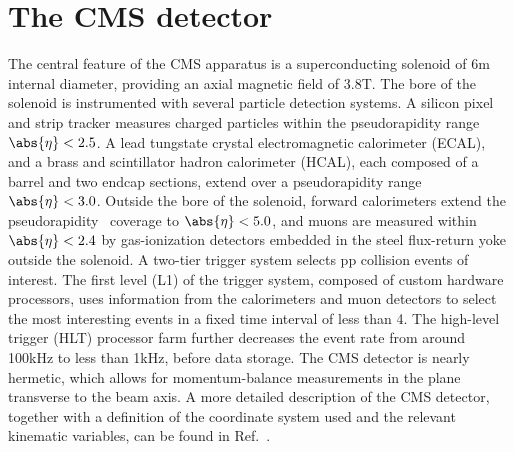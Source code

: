 \section{The CMS detector}
\label{sec:detector}


The central feature of the CMS apparatus is a superconducting solenoid
of 6\unit{m} internal diameter, providing an axial magnetic field of
3.8\unit{T}. The bore of the solenoid is instrumented with several
particle detection systems. A silicon pixel and strip tracker measures
charged particles within the pseudorapidity range $\abs{\eta} < 2.5$. 
A lead tungstate crystal electromagnetic calorimeter (ECAL), and a
brass and scintillator hadron calorimeter (HCAL), each composed of a
barrel and two endcap sections, extend over a pseudorapidity range
$\abs{\eta} < 3.0$. Outside the bore of the solenoid, forward
calorimeters extend the pseudorapidity~\cite{Chatrchyan:2008zzk}
coverage to $\abs{\eta} < 5.0$, and muons are measured within
$\abs{\eta} < 2.4$ by gas-ionization detectors embedded in the steel
flux-return yoke outside the solenoid. A two-tier trigger system
selects pp collision events of interest. The first level (L1) of the
trigger system, composed of custom hardware processors, uses
information from the calorimeters and muon detectors to select the
most interesting events in a fixed time interval of less than
4\mus. The high-level trigger (HLT) processor farm further decreases
the event rate from around 100\unit{kHz} to less than 1\unit{kHz},
before data storage. The CMS detector is nearly hermetic, which allows
for momentum-balance measurements in the plane transverse to the beam
axis. A more detailed description of the CMS detector, together with a
definition of the coordinate system used and the relevant kinematic
variables, can be found in Ref.~\cite{Chatrchyan:2008zzk}.

